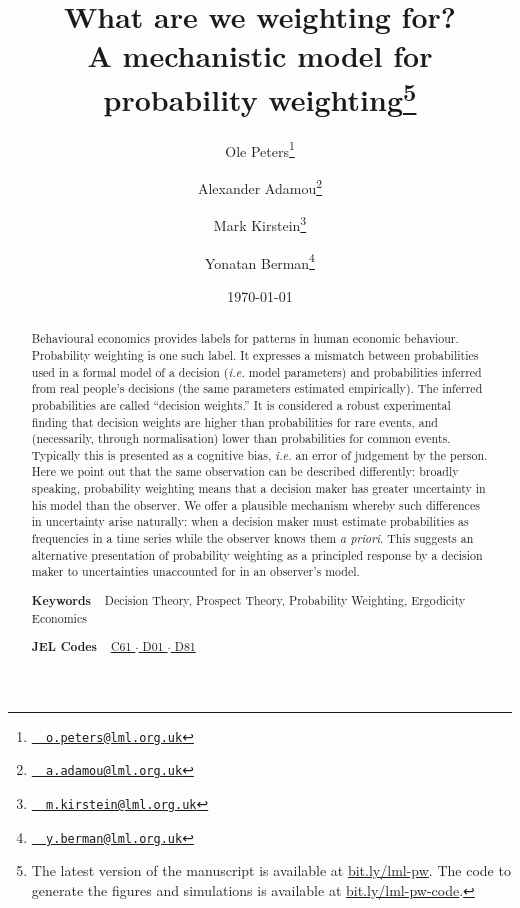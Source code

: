 \documentclass[a4paper, 12pt]{article}
\title{What are we weighting for? \\
{\normalsize A mechanistic model for probability weighting\thanks{The latest version of the manuscript is available at \href{https://bit.ly/lml-pw}{bit.ly/lml-pw}. The code to generate the figures and simulations is available at \href{https://bit.ly/lml-pw-code}{bit.ly/lml-pw-code}.}}}
\author[1,2]{Ole Peters\thanks{\texttt{\href{mailto:o.peters@lml.org.uk}{~\Letter~o.peters@lml.org.uk}}}}
\author[1]{Alexander Adamou\thanks{\texttt{\href{mailto:a.adamou@lml.org.uk}{~\Letter~a.adamou@lml.org.uk}}}}
\author[1,3,4]{Mark Kirstein\thanks{\texttt{\href{mailto:m.kirstein@lml.org.uk}{~\Letter~m.kirstein@lml.org.uk}}}}
\author[1,5]{Yonatan Berman\thanks{\texttt{\href{mailto:y.berman@lml.org.uk}{~\Letter~y.berman@lml.org.uk}}}}
\affil[1]{London Mathematical Laboratory, UK} %
\affil[2]{Santa Fe Institute, NM, USA} %
\affil[3]{Max-Planck-Institute for Mathematics in the Sciences, Leipzig, Germany} %
\affil[4]{Institute of Mathematics, Leipzig University, Germany} %
\date{\today}
\newcommand{\ie}{\textit{i.e.}\xspace}
\begin{document}
\begin{titlepage}
	\maketitle
\thispagestyle{fancy}

\begin{abstract}
\noindent 
Behavioural economics provides labels for patterns in human economic behaviour. Probability weighting is one such label. It expresses a mismatch between probabilities used in a formal model of a decision (\ie model parameters) and probabilities inferred from real people's decisions (the same parameters estimated empirically).
The inferred probabilities are called ``decision weights.'' It is considered a robust experimental finding that decision weights are higher than probabilities for rare events, and (necessarily, through normalisation) lower than probabilities for common events.
Typically this is presented as a cognitive bias, \ie an error of judgement by the person.
Here we point out that the same observation can be described differently: broadly speaking, probability weighting means that a decision maker has greater uncertainty in his model than the observer.
We offer a plausible mechanism whereby such differences in uncertainty arise naturally: when a decision maker must estimate probabilities as frequencies in a time series while the observer knows them \textit{a priori}.
This suggests an alternative presentation of probability weighting as a principled response by a decision maker to uncertainties unaccounted for in an observer's model.
\vspace{1em}

\noindent\textsf{\textbf{Keywords}} ~ Decision Theory, Prospect Theory, Probability Weighting, Ergodicity Economics
\vspace{.5em}

\noindent\textsf{\textbf{JEL Codes}} ~
\href{https://www.aeaweb.org/econlit/jelCodes.php?view=jel#C}{%
C61		%
$\cdot$
}%
\href{https://www.aeaweb.org/econlit/jelCodes.php?view=jel#D}{%
D01 	%
$\cdot$
D81 	%
}
\end{abstract}
\end{titlepage}
 
\setcounter{page}{2}		%
\end{document}
